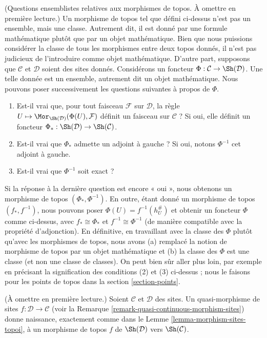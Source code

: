 \begin{remark}
\label{remark-morphism-topoi-big}
(Questions ensemblistes relatives aux morphismes de topos. À omettre
en première lecture.)
Un morphisme de topos tel que défini ci-dessus n’est pas un ensemble, mais une classe.
Autrement dit, il est donné par une formule mathématique plutôt que par un
objet mathématique. Bien que nous puissions considérer
la classe de tous les morphismes entre deux topos donnés,
il n’est pas judicieux de l’introduire comme objet mathématique.
D’autre part, supposons que $\mathcal{C}$ et $\mathcal{D}$ soient
des sites donnés. Considérons un foncteur
$\Phi : \mathcal{C} \to \Sh(\mathcal{D})$.
Une telle donnée est un ensemble, autrement dit un objet mathématique.
Nous pouvons poser successivement les questions suivantes à propos de $\Phi$.
\begin{enumerate}
\item Est-il vrai que, pour tout faisceau $\mathcal{F}$ sur $\mathcal{D}$,
la règle
$U \mapsto \Mor_{\Sh(\mathcal{D})}(\Phi(U), \mathcal{F})$
définit un faisceau sur $\mathcal{C}$ ? Si oui, elle définit un foncteur
$\Phi_* : \Sh(\mathcal{D}) \to \Sh(\mathcal{C})$.
\item Est-il vrai que $\Phi_*$ admette un adjoint à gauche ? Si oui,
notons $\Phi^{-1}$ cet adjoint à gauche.
\item Est-il vrai que $\Phi^{-1}$ soit exact ?
\end{enumerate}
Si la réponse à la dernière question est encore « oui », nous obtenons
un morphisme de topos $(\Phi_*, \Phi^{-1})$. En outre, étant donné un
morphisme de topos $(f_*, f^{-1})$, nous pouvons poser
$\Phi(U) = f^{-1}(h_U^\#)$ et obtenir un foncteur $\Phi$ comme ci-dessus,
avec $f_* \cong \Phi_*$ et $f^{-1} \cong \Phi^{-1}$ (de manière compatible
avec la propriété d’adjonction).
En définitive, en travaillant avec la classe des $\Phi$
plutôt qu’avec les morphismes de topos, nous avons (a) remplacé la notion de
morphisme de topos par un objet mathématique et (b)
la classe des $\Phi$ est une classe (et non une classe
de classes). On peut bien sûr aller plus loin, par exemple en précisant
la signification des conditions (2) et (3) ci-dessus ;
nous le faisons pour les points de topos dans la section \ref{section-points}.
\end{remark}

\begin{remark}
\label{remark-quasi-continuous-morphism-topoi}
(À omettre en première lecture.)
Soient $\mathcal{C}$ et $\mathcal{D}$ des sites.
Un quasi-morphisme de sites $f : \mathcal{D} \to \mathcal{C}$
(voir la Remarque \ref{remark-quasi-continuous-morphism-sites})
donne naissance, exactement comme dans le
Lemme \ref{lemma-morphism-sites-topoi}, à un morphisme de topos $f$ de
$\Sh(\mathcal{D})$ vers $\Sh(\mathcal{C})$.
\end{remark}










